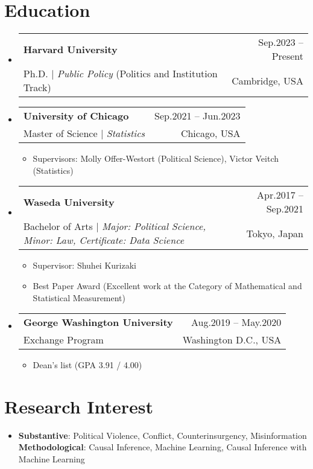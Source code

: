 \documentclass[letterpaper,11pt]{article} %
\makeatletter
\newcommand{\CVItem}[1]{
  \item\small{
    {#1 \vspace{-2pt}}
  }
}
\newcommand{\CVSubheading}[4]{
  \vspace{-2pt}\item
    \begin{tabular*}{0.97\textwidth}[t]{l@{\extracolsep{\fill}}r}
      \textbf{#1} & #2 \\
      \small#3 & \small #4 \\
    \end{tabular*}\vspace{-7pt}
}
\newcommand{\CVSubHeadingListStart}{\begin{itemize}[leftmargin=0.5cm, label={}]}
\newcommand{\CVSubHeadingListEnd}{\end{itemize}}
\newcommand{\CVItemListStart}{\begin{itemize}}
\newcommand{\CVItemListEnd}{\end{itemize}\vspace{-5pt}}
\makeatother
\begin{document}
\section{Education}
  \CVSubHeadingListStart
    \CVSubheading %
     {{Harvard University}}{Sep.2023 -- Present}
      {Ph.D. $|$ \emph{Public Policy} (Politics and Institution Track)}{Cambridge, USA}
    \CVSubheading
      {{University of Chicago}}{Sep.2021 -- Jun.2023}
      {Master of Science $|$ \emph{Statistics}}{Chicago, USA}
       \CVItemListStart
        \CVItem{Supervisors: Molly Offer-Westort (Political Science), Victor Veitch (Statistics)}

    \CVItemListEnd
    \CVSubheading
      {{Waseda University}}{Apr.2017 -- Sep.2021}
      {Bachelor of Arts $|$ \emph{\small{Major: Political Science, Minor: Law,  Certificate: Data Science}}}{Tokyo, Japan}
      \CVItemListStart
        \CVItem{Supervisor: Shuhei Kurizaki}
        \CVItem{Best Paper Award (Excellent work at the Category of Mathematical and Statistical Measurement)}
    \CVItemListEnd
    \CVSubheading
      {George Washington University}{Aug.2019 -- May.2020}
      {Exchange Program}{Washington D.C., USA}
      \CVItemListStart
        \CVItem{Dean's list (GPA 3.91 / 4.00)} %
    \CVItemListEnd
  \CVSubHeadingListEnd

\section{Research Interest}
\begin{itemize}[leftmargin=0.5cm, label={}]
    \item{
     \textbf{Substantive}{: Political Violence, Conflict, Counterinsurgency, Misinformation}\\
     \textbf{Methodological}{: Causal Inference, Machine Learning, Causal Inference with Machine Learning} \\
    }
 \end{itemize}
\end{document}
